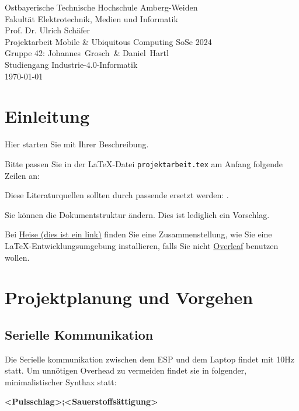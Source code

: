 \documentclass[12pt,oneside]{article}
\newcommand*{\IhrVornameEins}{Johannes}
\newcommand*{\IhrNachnameEins}{Grosch}
\newcommand*{\IhrVornameZwei}{Daniel}
\newcommand*{\IhrNachnameZwei}{Hartl}
\newcommand*{\IhreGruppe}{Gruppe 42}
\newcommand*{\IhrStudiengang}{Industrie-4.0-Informatik}
\newcommand*{\IhreArbeit}{Projektarbeit Mobile \& Ubiquitous Computing SoSe 2024}
\newcommand*{\IhrErstpruefer}{Prof. Dr. Ulrich Schäfer}
\begin{document}
  \thispagestyle{empty}
  \originalTeX
  \begin{center}
 	\Large
 	Ostbayerische Technische Hochschule Amberg-Weiden\\
 Fakultät Elektrotechnik, Medien und Informatik\\[.8cm]
 \large \IhrErstpruefer\\[.8cm]
 \Large \IhreArbeit\\[.8cm]
 \large \IhreGruppe: \IhrVornameEins\ \IhrNachnameEins\ \&
 \IhrVornameZwei\ \IhrNachnameZwei\\[.8cm]
 \large Studiengang \IhrStudiengang\\[.8cm]
 \today\\[2.5cm]
  \end{center}
  
  \tableofcontents

  \clearpage
  
  
  \section{Einleitung}
  
  Hier starten Sie mit Ihrer Beschreibung.
  
  Bitte passen Sie in der \LaTeX-Datei \texttt{projektarbeit.tex} am Anfang folgende 
  Zeilen an:
  
  Diese Literaturquellen sollten durch passende ersetzt werden: \cite{Breymann:2020,jabref,Schaefer_Spurk:2010,ct_LaTeX:2005,zotero}.
  
  Sie können die Dokumentstruktur ändern. Dies ist lediglich ein Vorschlag.
  
  Bei \href{https://www.heise.de/download/blog/Einfuehrung-in-LaTeX-3599742}{Heise (dies ist ein link)} finden Sie 
  eine Zusammenstellung, wie Sie eine \LaTeX-Entwicklungsumgebung installieren, falls Sie nicht
  \href{https://www.overleaf.com}{Overleaf} benutzen wollen.

  
  \section{Projektplanung und Vorgehen}
  \subsection{Serielle Kommunikation}
  Die Serielle kommunikation zwischen dem ESP und dem Laptop findet mit 10Hz statt. Um unnötigen Overhead zu vermeiden findet sie in folgender, minimalistischer Synthax statt:\par
  \textbf{<Pulsschlag>;<Sauerstoffsättigung>}\par
  
\end{document}
